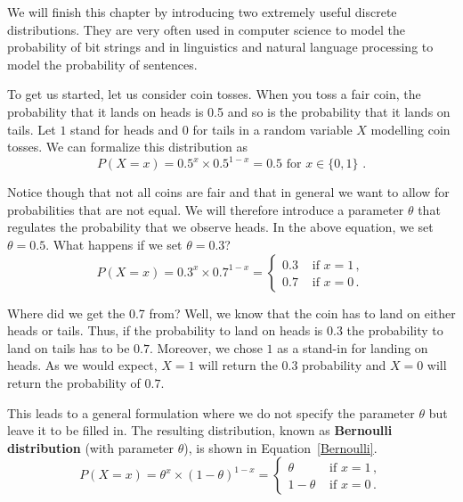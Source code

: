 We will finish this chapter by introducing two extremely useful discrete distributions. They are very often used in
computer science to model the probability of bit strings and in linguistics and natural language processing to model
the probability of sentences. 

To get us started, let us consider coin tosses. When you toss a fair coin, the probability that it lands on heads is 0.5 and
so is the probability that it lands on tails. Let $ 1 $ stand for heads and $ 0 $ for tails in a random variable $ X $ 
modelling coin tosses. We can formalize this distribution as
\begin{equation*}
P(X=x) = 0.5^{x}\times 0.5^{1-x} = 0.5 \mbox{ for $x \in \{0,1\}$ .}
\end{equation*}

Notice though that not all coins are fair and that in general we want to allow for probabilities that are not equal. 
We will therefore introduce a parameter $ \theta $ that regulates the probability that we observe heads. In the
above equation, we set $ \theta = 0.5 $. What happens if we set $ \theta = 0.3 $?
\begin{equation}
P(X=x) = 0.3^{x} \times 0.7^{1-x} = 
\begin{cases}
0.3 & \mbox{ if $x=1$} \, , \\
0.7 & \mbox{ if $x=0$} \, .
\end{cases}
\end{equation}

Where did we get the 0.7 from? Well, we know that the coin has to land on either heads or tails. Thus, if the probability
to land on heads is $ 0.3 $ the probability to land on tails has to be $ 0.7 $. Moreover, we chose $ 1 $ as a stand-in for
landing on heads. As we would expect, $ X = 1 $ will return the $ 0.3 $ probability and $ X = 0 $ will return the probability of $ 0.7 $.

This leads to a general formulation where we do not specify the parameter $ \theta $ but leave it to be filled in. 
The resulting distribution, known as \textbf{Bernoulli distribution} (with parameter $ \theta $), is shown in Equation~\eqref{Bernoulli}.
\begin{equation}\label{Bernoulli}
P(X=x) = \theta^{x} \times (1 - \theta)^{1-x} =
\begin{cases}
\theta & \mbox{ if $x=1$} \, , \\
1-\theta & \mbox{ if $x=0$} \, .
\end{cases}
\end{equation}

